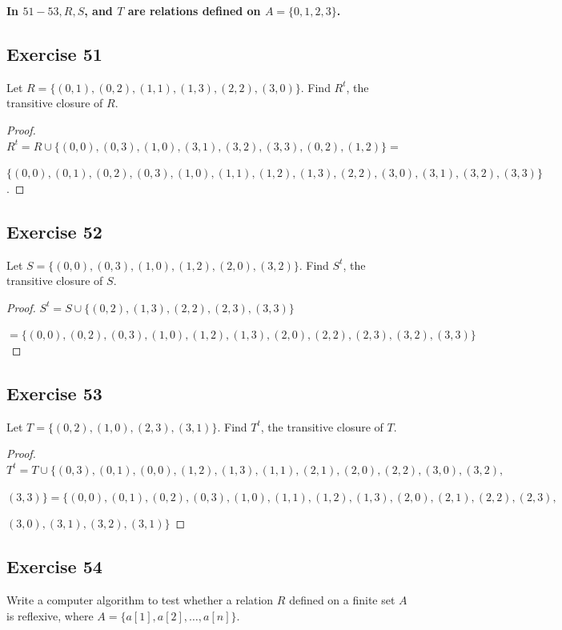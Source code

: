 \documentclass[14pt]{extarticle}
\newcommand{\cy}{\color{cyan}}
\begin{document}
{\bf \cy In \(51-53, R, S\), and \(T\) are relations defined on \(A = \{0, 1, 2, 3\}\).}

\subsection{Exercise 51}
Let \(R = \{(0, 1), (0, 2), (1, 1), (1, 3), (2, 2), (3, 0)\}\). Find \(R^t\), the transitive closure of \(R\).

\begin{proof}
        \(R^t = R \cup \{(0, 0), (0, 3), (1, 0), (3, 1), (3, 2), (3, 3), (0, 2), (1, 2)\} = \)

        \(\{(0, 0), (0, 1), (0, 2), (0, 3), (1, 0), (1, 1), (1, 2), (1, 3), (2, 2), (3, 0), (3, 1), (3, 2), (3, 3)\}\).
\end{proof}

\subsection{Exercise 52}
Let \(S = \{(0, 0), (0, 3), (1, 0), (1, 2), (2, 0), (3, 2)\}\). Find \(S^t\), the transitive closure of \(S\).

\begin{proof}
        \(S^t = S \cup \{(0,2),(1,3),(2,2),(2,3),(3,3)\}\)

        \( = \{(0, 0), (0,2),(0, 3), (1, 0), (1, 2), (1,3),(2, 0),(2,2), (2,3),(3, 2),(3,3)\}\)
\end{proof}

\subsection{Exercise 53}
Let \(T = \{(0, 2), (1, 0), (2, 3), (3, 1)\}\). Find \(T^t\), the transitive closure of \(T\).

\begin{proof}
        \(T^t = T \cup \{(0,3),(0,1),(0,0),(1,2),(1,3),(1,1),(2,1),(2,0),(2,2),(3,0),(3,2),\)

        \((3,3)\} = \{(0,0),(0,1),(0, 2),(0,3), (1, 0),(1, 1),(1, 2),(1, 3), (2,0),(2,1),(2,2),(2, 3),\)

        \((3,0),(3,1),(3,2),(3, 1)\}\)
\end{proof}

\subsection{Exercise 54}
Write a computer algorithm to test whether a relation \(R\) defined on a finite set \(A\) is reflexive, where
\(A = \{a[1], a[2], \ldots, a[n]\}\).
\end{document}

